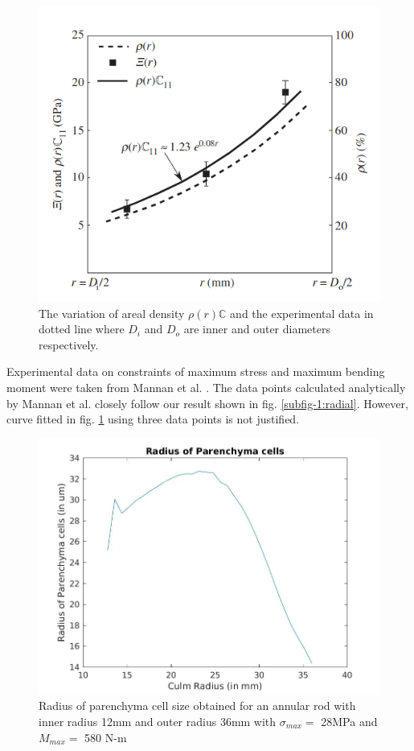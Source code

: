 \documentclass[openright,twoside]{iitkthesis}
\begin{document}
\begin{figure}[H]
\begin{center}
\includegraphics[scale=0.41]{./Plots/normal/mnn.png}
\caption{The variation of areal density $\rho(r)\mathbb{C}$ and the experimental data in dotted line where $D_i$ and $D_o$ are inner and outer diameters respectively. \cite{mannan2017correlations} }
\label{fig:radial2}
\end{center}
\end{figure}
Experimental data on constraints of maximum stress and maximum bending moment were taken from Mannan et al. \cite{mannan2017correlations}. The data points calculated analytically by Mannan et al. \cite{mannan2017correlations} closely follow our result shown in fig. \ref{subfig-1:radial}. However, curve fitted in fig. \ref{fig:radial2} using three data points is not justified.\\
\begin{figure}[H]
\begin{center}
    \includegraphics[scale=0.3]{./Plots/normal/b77.jpg}
    \caption{Radius of parenchyma cell size obtained for an annular rod with inner radius 12mm and outer radius 36mm with $\sigma_{max} = $ 28MPa and $M_{max} = $ 580 N-m}
\label{fig:cellsize}
\end{center}
\end{figure}
\end{document}
